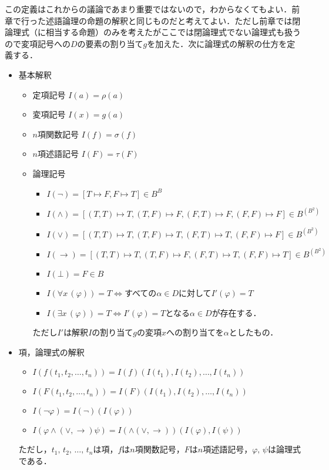 \documentclass[10pt,b5paper,papersize,dvipdfmx]{jsbook}
\newcommand\fal[1]{\forall#1\,}
\newcommand\ext[1]{\exists#1\,}
\begin{document}
この定義はこれからの議論であまり重要ではないので，わからなくてもよい．前章で行った述語論理の命題の解釈と同じものだと考えてよい．ただし前章では閉論理式（に相当する命題）のみを考えたがここでは閉論理式でない論理式も扱うので変項記号への$D$の要素の割り当て$g$を加えた．次に論理式の解釈の仕方を定義する．
\begin{itemize}
\item 基本解釈
\begin{itemize}
  \item 定項記号 $I(a)=\rho(a)$
  \item 変項記号 $I(x)=g(a)$
  \item $n$項関数記号 $I(f)=\sigma(f)$
  \item $n$項述語記号 $I(F)=\tau(F)$
  \item 論理記号
  \begin{itemize}
    \item $I(\lnot) = [T\mapsto F,F\mapsto T]\in B^B$
    \item $I(\land) = [(T,T)\mapsto T,(T,F)\mapsto F,(F,T)\mapsto F,(F,F)\mapsto F]\in B^{(B^2)}$
    \item $I(\lor) = [(T,T)\mapsto T,(T,F)\mapsto T,(F,T)\mapsto T,(F,F)\mapsto F]\in B^{(B^2)}$
    \item $I(\to) = [(T,T)\mapsto T,(T,F)\mapsto F,(F,T)\mapsto T,(F,F)\mapsto T]\in B^{(B^2)}$
    \item $I(\bot) = F\in B$
    \item $I(\fal{x}(\varphi)) = T\Leftrightarrow$すべての$\alpha \in D$に対して$I'(\varphi) = T$
    \item $I(\ext{x}(\varphi)) = T\Leftrightarrow I'(\varphi) = T$となる$\alpha \in D$が存在する．
  \end{itemize}
  ただし$I'$は解釈$I$の割り当て$g$の変項$x$への割り当てを$\alpha$としたもの．
\end{itemize}
\item 項，論理式の解釈
  \begin{itemize}
    \item $I(f(t_1,t_2,\dots,t_n))=I(f)(I(t_1),I(t_2),\dots,I(t_n))$
    \item $I(F(t_1,t_2,\dots,t_n))=I(F)(I(t_1),I(t_2),\dots,I(t_n))$
    \item $I(\lnot \varphi)=I(\lnot)(I(\varphi))$
    \item $I(\varphi \land(\lor,\to)\psi)=I(\land(\lor,\to))(I(\varphi),I(\psi))$
    \end{itemize}
  ただし，$t_1,\, t_2,\, \dots,\, t_n$は項，$f$は$n$項関数記号，$F$は$n$項述語記号，$\varphi,\, \psi$は論理式である．
  \end{itemize}
\end{document}
